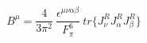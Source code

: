 \begin{equation}
B^\mu=\frac{4}{3\pi^2}~\frac{\epsilon^{\mu\nu\alpha\beta}}{F_\pi^6}~tr\{J_\nu^R J_\alpha^R J_\beta^R \}
\end{equation}

